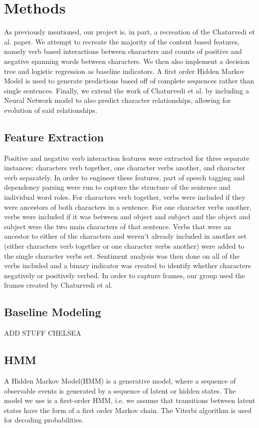 \documentclass[11pt,a4paper]{article}
\begin{document}
\section{Methods}
As previously mentioned, our project is, in part, a recreation of the Chaturvedi et al. paper. We attempt to recreate the majority of the content based features, namely verb based interactions between characters and counts of positive and negative spanning words between characters. We then also implement a decision tree and logistic regression as baseline indicators. A first order Hidden Markov Model is used to generate predictions based off of complete sequences rather than single sentences. Finally, we extend the work of Chaturvedi et al. by including a Neural Network model to also predict character relationships, allowing for evolution of said relationships.

\subsection{Feature Extraction}
Positive and negative verb interaction features were extracted for three separate instances: characters verb together, one character verbs another, and character verb separately. In order to engineer these features, part of speech tagging and dependency parsing were run to capture the structure of the sentence and individual word roles. For characters verb together, verbs were included if they were ancestors of both characters in a sentence. For one character verbs another, verbs were included if it was between and object and subject and the object and subject were the two main characters of that sentence. Verbs that were an ancestor to either of the characters and weren't already included in another set (either characters verb together or one character verbs another) were added to the single character verbs set. Sentiment analysis was then done on all of the verbs included and a binary indicator was created to identify whether characters negatively or positively verbed. 
In order to capture frames, our group used the frames created by Chaturvedi et al.

\subsection{Baseline Modeling}

ADD STUFF CHELSEA 


\subsection{HMM}
A Hidden Markov Model(HMM) is a generative model, where a sequence of observable events is generated by a sequence of latent or hidden states. The model we use is a first-order HMM, i.e. we assume that transitions between latent states have the form of a first order Markov chain. The Viterbi algorithm is used for decoding probabilities.
\end{document}

